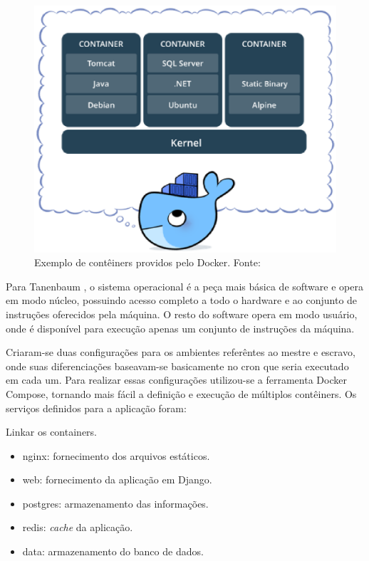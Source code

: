 \begin{figure}[!h]
    \centering
    \includegraphics[keepaspectratio=true,scale=0.8]{figuras/container.eps}
    \caption{Exemplo de contêiners providos pelo Docker. Fonte: \cite{docker} }
    \label{container}
\end{figure}

Para Tanenbaum \cite{tanenbaum_2007}, o sistema operacional é a peça mais básica de software e opera em modo núcleo, possuindo acesso completo a todo o hardware e ao conjunto de instruções oferecidos pela máquina. O resto do software opera em modo usuário, onde é disponível para execução apenas um conjunto de instruções da máquina.

Criaram-se duas configurações para os ambientes referêntes ao mestre e escravo, onde suas diferenciações baseavam-se basicamente no cron que seria executado em cada um. Para realizar essas configurações utilizou-se a ferramenta Docker Compose, tornando mais fácil a definição e execução de múltiplos contêiners. Os serviços definidos para a aplicação foram:

Linkar os containers.

\begin{itemize}
    \item nginx: fornecimento dos arquivos estáticos.
    \item web: fornecimento da aplicação em Django.
    \item postgres: armazenamento das informações.
    \item redis: \textit{cache} da aplicação.
    \item data: armazenamento do banco de dados.
\end{itemize}

